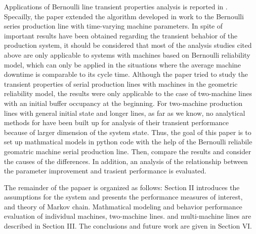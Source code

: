 Applications of Bernoulli line transient properties analysis is reported in \cite{chen2012energy, wang2010transient, chen2011feedback}. Specailly, the paper \cite{chen2012energy} extended the algorithm developed in work\cite{zhang2013transient} to the Bernoulli series production line with time-varying machine parameters. In spite of important results have been obtained regarding the transient behabior of the production system, it should be considered that most of the analysis studies cited above are only applicable to systems with machines based on Bernoulli reliability model, which can only be applied in the situations where the average machine downtime is comparable to its cycle time. Although the paper \cite{meerkov2010transient} tried to study the transient properties of serial production lines with machines in the geometric reliability model, the results were only applicable to the case of two-machine lines with an initial buffer occupancy at the beginning. For two-machine production lines with general initial state and longer lines, as far as we know, no analytical methods for have been built up for analysis of their transient performance because of larger dimension of the system state. Thus, the goal of this paper is to set up mathmatical models in python code with the help of the Bernoulli reliabile geomatric machine serial production line. Then, compare the results and consider the causes of the differences. In addition, an analysis of the relationship between the parameter improvement and  trasient performance is evaluated.

The remainder of the papaer is organized as follows: Section II introduces the assumptions for the system and presents the performance measures of interest, and theory of Markov chain. Mathmatical modeling and behavior performance evaluation of individual machines, two-machine lines. and multi-machine lines are described in Section III. The conclusions and future work are given in Section VI.